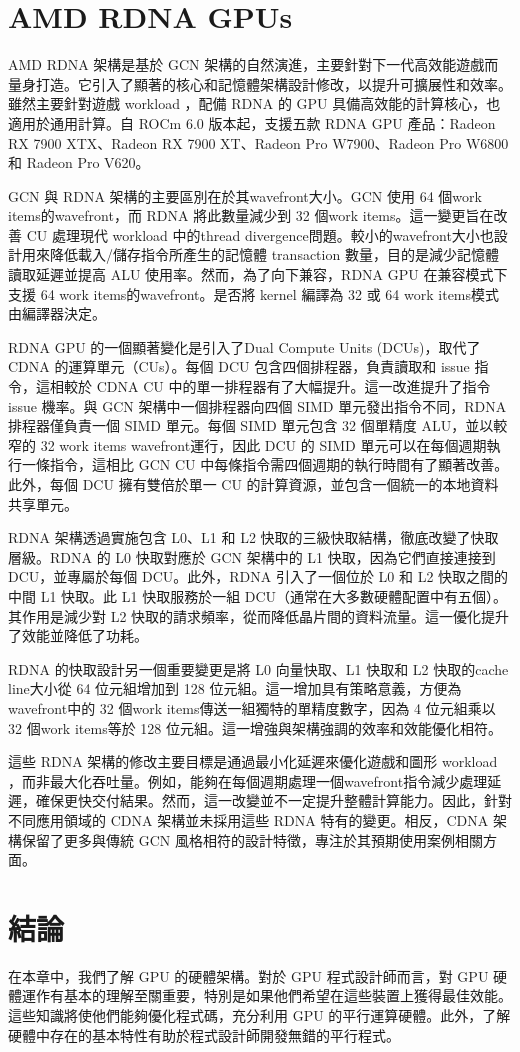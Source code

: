 \section{AMD RDNA GPUs}

AMD RDNA 架構是基於 GCN 架構的自然演進，主要針對下一代高效能遊戲而量身打造。它引入了顯著的核心和記憶體架構設計修改，以提升可擴展性和效率。雖然主要針對遊戲 workload ，配備 RDNA 的 GPU 具備高效能的計算核心，也適用於通用計算。自 ROCm 6.0 版本起，支援五款 RDNA GPU 產品：Radeon RX 7900 XTX、Radeon RX 7900 XT、Radeon Pro W7900、Radeon Pro W6800 和 Radeon Pro V620。

GCN 與 RDNA 架構的主要區別在於其wavefront大小。GCN 使用 64 個work items的wavefront，而 RDNA 將此數量減少到 32 個work items。這一變更旨在改善 CU 處理現代 workload 中的thread divergence問題。較小的wavefront大小也設計用來降低載入/儲存指令所產生的記憶體 transaction 數量，目的是減少記憶體讀取延遲並提高 ALU 使用率。然而，為了向下兼容，RDNA GPU 在兼容模式下支援 64 work items的wavefront。是否將 kernel 編譯為 32 或 64 work items模式由編譯器決定。

RDNA GPU 的一個顯著變化是引入了Dual Compute Units (DCUs)，取代了 CDNA 的運算單元（CUs）。每個 DCU 包含四個排程器，負責讀取和 issue 指令，這相較於 CDNA CU 中的單一排程器有了大幅提升。這一改進提升了指令 issue 機率。與 GCN 架構中一個排程器向四個 SIMD 單元發出指令不同，RDNA 排程器僅負責一個 SIMD 單元。每個 SIMD 單元包含 32 個單精度 ALU，並以較窄的 32 work items wavefront運行，因此 DCU 的 SIMD 單元可以在每個週期執行一條指令，這相比 GCN CU 中每條指令需四個週期的執行時間有了顯著改善。此外，每個 DCU 擁有雙倍於單一 CU 的計算資源，並包含一個統一的本地資料共享單元。

RDNA 架構透過實施包含 L0、L1 和 L2 快取的三級快取結構，徹底改變了快取層級。RDNA 的 L0 快取對應於 GCN 架構中的 L1 快取，因為它們直接連接到 DCU，並專屬於每個 DCU。此外，RDNA 引入了一個位於 L0 和 L2 快取之間的中間 L1 快取。此 L1 快取服務於一組 DCU（通常在大多數硬體配置中有五個）。其作用是減少對 L2 快取的請求頻率，從而降低晶片間的資料流量。這一優化提升了效能並降低了功耗。

RDNA 的快取設計另一個重要變更是將 L0 向量快取、L1 快取和 L2 快取的cache line大小從 64 位元組增加到 128 位元組。這一增加具有策略意義，方便為wavefront中的 32 個work items傳送一組獨特的單精度數字，因為 4 位元組乘以 32 個work items等於 128 位元組。這一增強與架構強調的效率和效能優化相符。

這些 RDNA 架構的修改主要目標是通過最小化延遲來優化遊戲和圖形 workload ，而非最大化吞吐量。例如，能夠在每個週期處理一個wavefront指令減少處理延遲，確保更快交付結果。然而，這一改變並不一定提升整體計算能力。因此，針對不同應用領域的 CDNA 架構並未採用這些 RDNA 特有的變更。相反，CDNA 架構保留了更多與傳統 GCN 風格相符的設計特徵，專注於其預期使用案例相關方面。

\section{結論}
在本章中，我們了解 GPU 的硬體架構。對於 GPU 程式設計師而言，對 GPU 硬體運作有基本的理解至關重要，特別是如果他們希望在這些裝置上獲得最佳效能。這些知識將使他們能夠優化程式碼，充分利用 GPU 的平行運算硬體。此外，了解硬體中存在的基本特性有助於程式設計師開發無錯的平行程式。
